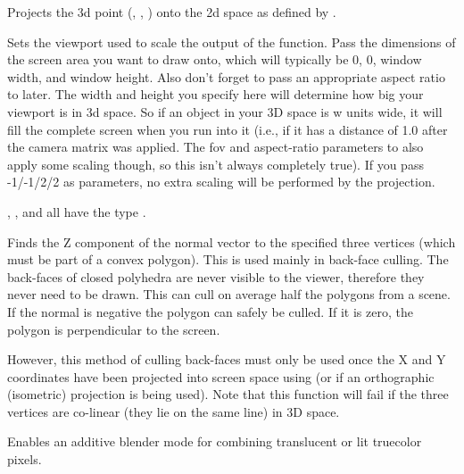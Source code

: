 
Projects the 3d point (, , ) onto the 2d space as defined by .


Sets the viewport used to scale the output of the  function. Pass the dimensions of the screen area you want to draw onto, which will typically be 0, 0, window width, and window height. Also don't forget to pass an appropriate aspect ratio to  later. The width and height you specify here will determine how big your viewport is in 3d space. So if an object in your 3D space is w units wide, it will fill the complete screen when you run into it (i.e., if it has a distance of 1.0 after the camera matrix was applied. The fov and aspect-ratio parameters to  also apply some scaling though, so this isn't always completely true). If you pass -1/-1/2/2 as parameters, no extra scaling will be performed by the projection.


, , and  all have the type .

Finds the Z component of the normal vector to the specified three vertices (which must be part of a convex polygon). This is used mainly in back-face culling. The back-faces of closed polyhedra are never visible to the viewer, therefore they never need to be drawn. This can cull on average half the polygons from a scene. If the normal is negative the polygon can safely be culled. If it is zero, the polygon is perpendicular to the screen.  

However, this method of culling back-faces must only be used once the X and Y coordinates have been projected into screen space using  (or if an orthographic (isometric) projection is being used). Note that this function will fail if the three vertices are co-linear (they lie on the same line) in 3D space.


Enables an additive blender mode for combining translucent or lit truecolor pixels.


